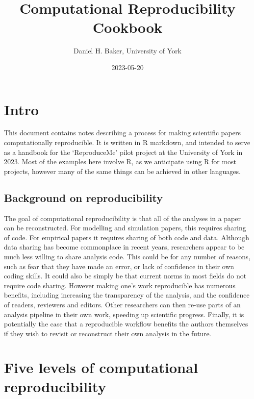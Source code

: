 \documentclass[
]{article}
\title{Computational Reproducibility Cookbook}
\author{Daniel H. Baker, University of York}
\date{2023-05-20}
\begin{document}
\maketitle

\hypertarget{intro}{%
\section{Intro}\label{intro}}

This document contains notes describing a process for making scientific papers computationally reproducible. It is written in R markdown, and intended to serve as a handbook for the `ReproduceMe' pilot project at the University of York in 2023. Most of the examples here involve R, as we anticipate using R for most projects, however many of the same things can be achieved in other languages.

\hypertarget{background-on-reproducibility}{%
\subsection{Background on reproducibility}\label{background-on-reproducibility}}

The goal of computational reproducibility is that all of the analyses in a paper can be reconstructed. For modelling and simulation papers, this requires sharing of code. For empirical papers it requires sharing of both code and data. Although data sharing has become commonplace in recent years, researchers appear to be much less willing to share analysis code. This could be for any number of reasons, such as fear that they have made an error, or lack of confidence in their own coding skills. It could also be simply be that current norms in most fields do not require code sharing. However making one's work reproducible has numerous benefits, including increasing the transparency of the analysis, and the confidence of readers, reviewers and editors. Other researchers can then re-use parts of an analysis pipeline in their own work, speeding up scientific progress. Finally, it is potentially the case that a reproducible workflow benefits the authors themselves if they wish to revisit or reconstruct their own analysis in the future.

\hypertarget{five-levels-of-computational-reproducibility}{%
\section{Five levels of computational reproducibility}\label{five-levels-of-computational-reproducibility}}
\end{document}
